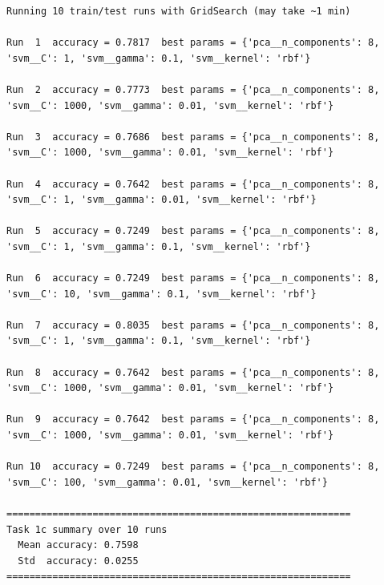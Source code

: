 \begin{verbatim}
Running 10 train/test runs with GridSearch (may take ~1 min)

Run  1  accuracy = 0.7817  best params = {'pca__n_components': 8,
'svm__C': 1, 'svm__gamma': 0.1, 'svm__kernel': 'rbf'}

Run  2  accuracy = 0.7773  best params = {'pca__n_components': 8,
'svm__C': 1000, 'svm__gamma': 0.01, 'svm__kernel': 'rbf'}

Run  3  accuracy = 0.7686  best params = {'pca__n_components': 8,
'svm__C': 1000, 'svm__gamma': 0.01, 'svm__kernel': 'rbf'}

Run  4  accuracy = 0.7642  best params = {'pca__n_components': 8,
'svm__C': 1, 'svm__gamma': 0.01, 'svm__kernel': 'rbf'}

Run  5  accuracy = 0.7249  best params = {'pca__n_components': 8,
'svm__C': 1, 'svm__gamma': 0.1, 'svm__kernel': 'rbf'}

Run  6  accuracy = 0.7249  best params = {'pca__n_components': 8,
'svm__C': 10, 'svm__gamma': 0.1, 'svm__kernel': 'rbf'}

Run  7  accuracy = 0.8035  best params = {'pca__n_components': 8,
'svm__C': 1, 'svm__gamma': 0.1, 'svm__kernel': 'rbf'}

Run  8  accuracy = 0.7642  best params = {'pca__n_components': 8,
'svm__C': 1000, 'svm__gamma': 0.01, 'svm__kernel': 'rbf'}

Run  9  accuracy = 0.7642  best params = {'pca__n_components': 8,
'svm__C': 1000, 'svm__gamma': 0.01, 'svm__kernel': 'rbf'}

Run 10  accuracy = 0.7249  best params = {'pca__n_components': 8,
'svm__C': 100, 'svm__gamma': 0.01, 'svm__kernel': 'rbf'}

============================================================
Task 1c summary over 10 runs
  Mean accuracy: 0.7598
  Std  accuracy: 0.0255
============================================================
\end{verbatim}
